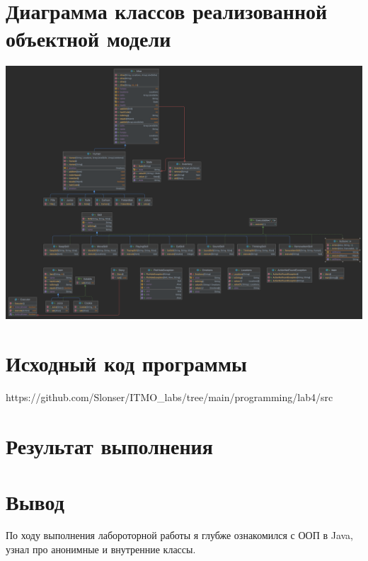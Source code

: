 \documentclass[12pt,onecolumn]{article}
\begin{document}
\section{Диаграмма классов реализованной объектной модели}
\includegraphics[width=\columnwidth]{diagram.png}
\newpage
\section{Исходный код программы}
https://github.com/Slonser/ITMO\_labs/tree/main/programming/lab4/src
\newpage
\section{Результат выполнения}

\newpage
\section{Вывод}
По ходу выполнения лабороторной работы я глубже ознакомился с ООП в Java, узнал про анонимные и внутренние классы.
\end{document}
